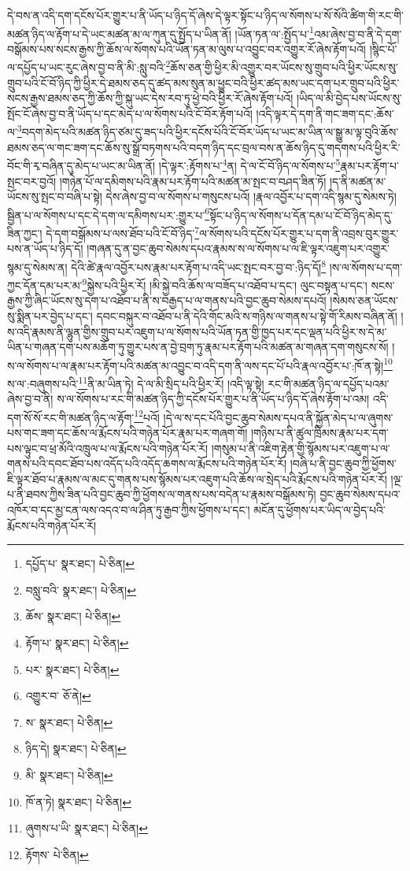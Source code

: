 དེ་བས་ན་འདི་དག་དངོས་པོར་གྱུར་པ་ནི་ཡོད་པ་ཉིད་དོ་ཞེས་དེ་ལྟར་སྟོང་པ་ཉིད་ལ་སོགས་པ་སོ་སོའི་ཚིག་གི་རང་གི་མཚན་ཉིད་ལ་རྟོག་པ་དེ་ཡང་མཚན་མ་ལ་ཀུན་དུ་སྤྱོད་པ་ཡིན་ནོ། །ཡོན་ཏན་ལ་:སྤྱོད་པ་\footnote{དཔྱོད་པ་  སྣར་ཐང་།  པེ་ཅིན། }འམ་ཞེས་བྱ་བ་ནི་དེ་དག་བསྒོམས་པས་སངས་རྒྱས་ཀྱི་ཆོས་ལ་སོགས་པའི་ཡོན་ཏན་མ་ལུས་པ་འབྱུང་བར་འགྱུར་རོ་ཞེས་རྟོག་པའོ། །སྙིང་པོ་ལ་དཔྱོད་པ་ཡང་རུང་ཞེས་བྱ་བ་ནི་མི་:སླུ་བའི་\footnote{བསླུ་བའི་  སྣར་ཐང་།  པེ་ཅིན། }ཆོས་ཅན་གྱི་ཕྱིར་མི་འགྱུར་བར་ཡོངས་སུ་གྲུབ་པའི་ཕྱིར་ཡོངས་སུ་གྲུབ་པའི་ངོ་བོ་ཉིད་ཀྱི་ཕྱིར་དེ་ཐམས་ཅད་དུ་ཚད་མས་སུན་མ་ཕྱུང་བའི་ཕྱིར་ཚད་མས་ཡང་དག་པར་གྲུབ་པའི་ཕྱིར་སངས་རྒྱས་ཐམས་ཅད་ཀྱི་ཆོས་ཀྱི་སྐུ་ཡང་དེས་རབ་ཏུ་ཕྱེ་བའི་ཕྱིར་རོ་ཞེས་རྟོག་པའོ། །ཡིད་ལ་མི་བྱེད་པས་ཡོངས་སུ་སྤོང་ངོ་ཞེས་བྱ་བ་ནི་ཡོད་པ་དང་མེད་པ་ལ་སོགས་པའི་ངོ་བོར་རྟོག་པའོ། །འདི་ལྟར་དེ་དག་ནི་གང་ཟག་དང་:ཆོས་ལ་\footnote{ཆོས་  སྣར་ཐང་།  པེ་ཅིན། }བདག་མེད་པའི་མཚན་ཉིད་ཙམ་དུ་ཟད་པའི་ཕྱིར་དངོས་པོའི་ངོ་བོར་ཡོད་པ་ཡང་མ་ཡིན་ལ་སྒྱུ་མ་ལྟ་བུའི་ཆོས་ཐམས་ཅད་ལ་གང་ཟག་དང་ཆོས་སུ་སྒྲོ་བཏགས་པའི་བདག་ཉིད་དང་བྲལ་བས་ན་ཆོས་ཉིད་དུ་གདགས་པའི་ཕྱིར་རི་བོང་གི་རྭ་བཞིན་དུ་མེད་པ་ཡང་མ་ཡིན་ནོ། །དེ་ལྟར་:རྟོགས་པ་\footnote{རྟོག་པ་  སྣར་ཐང་།  པེ་ཅིན། }ན། དེ་ལ་ངོ་བོ་ཉིད་ལ་སོགས་པ་\footnote{པར་  སྣར་ཐང་།  པེ་ཅིན། }རྣམ་པར་རྟོག་པ་སྤང་བར་བྱའོ། །གཉེན་པོ་ལ་དམིགས་པའི་རྣམ་པར་རྟོག་པའི་མཚན་མ་སྤང་བ་བཤད་ཟིན་ཏོ། །ད་ནི་མཚན་མ་ཡོངས་སུ་སྤང་བ་བཞི་པ་སྟེ། དེས་ཞེས་བྱ་བ་ལ་སོགས་པ་གསུངས་པའོ། །རྣལ་འབྱོར་པ་དག་འདི་སྙམ་དུ་སེམས་ཏེ། སྦྱིན་པ་ལ་སོགས་པ་དང་དེ་དག་ལ་དམིགས་པར་:གྱུར་པ་\footnote{འགྱུར་བ་  ཅོ་ནེ། }སྟོང་པ་ཉིད་ལ་སོགས་པ་དོན་དམ་པ་ངོ་བོ་ཉིད་མེད་དུ་ཟིན་ཀྱང་། དེ་དག་བསྒོམས་པ་ལས་ཐོབ་པའི་ངོ་བོ་ཉིད་\footnote{ས་  སྣར་ཐང་།  པེ་ཅིན། }ལ་སོགས་པའི་དངོས་པོར་གྱུར་པ་དག་ནི་འབྲས་བུར་གྱུར་པས་ན་ཡོད་པ་ཉིད་དོ། །གཞན་དུ་ན་བྱང་ཆུབ་སེམས་དཔའ་རྣམས་ས་ལ་སོགས་པ་ལ་ཇི་ལྟར་འཇུག་པར་འགྱུར་སྙམ་དུ་སེམས་ན། དེའི་ཚེ་རྣལ་འབྱོར་པས་རྣམ་པར་རྟོག་པ་འདི་ཡང་སྤང་བར་བྱ་བ་:ཉིད་དོ།\footnote{ཉིད་དེ།  སྣར་ཐང་།  པེ་ཅིན། } །ས་ལ་སོགས་པ་དག་ཀྱང་དོན་དམ་པར་མ་\footnote{མི་  སྣར་ཐང་།  པེ་ཅིན། }སྐྱེས་པའི་ཕྱིར་རོ། །མི་སྐྱེ་བའི་ཆོས་ལ་བཟོད་པ་འཐོབ་པ་དང་། ལུང་བསྟན་པ་དང་། སངས་རྒྱས་ཀྱི་ཞིང་ཡོངས་སུ་དག་པ་འཐོབ་པ་ནི་ས་བརྒྱད་པ་ལ་གནས་པའི་བྱང་ཆུབ་སེམས་དཔའོ། །སེམས་ཅན་ཡོངས་སུ་སྨིན་པར་བྱེད་པ་དང་། དབང་བསྐུར་བ་འཐོབ་པ་ནི་དེའི་གོང་མའི་ས་གཉིས་ལ་གནས་པ་སྟེ་གོ་རིམས་བཞིན་ནོ། །ས་འདི་རྣམས་ནི་ལྷུན་གྱིས་གྲུབ་པར་འཇུག་པ་ལ་སོགས་པའི་ཡོན་ཏན་གྱི་ཁྱད་པར་དང་ལྡན་པའི་ཕྱིར་ས་དེ་མ་ཡིན་པ་གཞན་དག་པས་མཆོག་ཏུ་གྱུར་པས་ན་བྱེ་བྲག་ཏུ་རྣམ་པར་རྟོག་པའི་མཚན་མ་གཞན་དག་གསུངས་སོ། །ས་ལ་སོགས་པ་ལ་རྣམ་པར་རྟོག་པའི་མཚན་མ་འབྱུང་བ་འདི་དག་ནི་ལས་དང་པོ་པའི་རྣལ་འབྱོར་པ་:ཁོ་ན་སྟེ།\footnote{ཁོ་ན་ཏེ།  སྣར་ཐང་།  པེ་ཅིན། } ས་ལ་:བཞུགས་པའི་\footnote{ཞུགས་པ་ཡི་  སྣར་ཐང་།  པེ་ཅིན། }ནི་མ་ཡིན་ཏེ། དེ་ལ་མི་སྲིད་པའི་ཕྱིར་རོ། །འདི་ལྟ་སྟེ། རང་གི་མཚན་ཉིད་ལ་དཔྱོད་པའམ་ཞེས་བྱ་བ་ནི། ས་ལ་སོགས་པ་རང་གི་མཚན་ཉིད་ཀྱི་དངོས་པོར་གྱུར་པ་ནི་ཡོད་པ་ཉིད་དོ་ཞེས་རྟོག་པ་འམ། འདི་དག་སོ་སོ་རང་གི་མཚན་ཉིད་ལ་རྟོག་\footnote{རྟོགས་  པེ་ཅིན། }པའོ། །དེ་ལ་ས་དང་པོའི་བྱང་ཆུབ་སེམས་དཔའ་ནི་སྐྱོན་མེད་པ་ལ་ཞུགས་པས་གང་ཟག་དང་ཆོས་ལ་རྨོངས་པའི་གཉེན་པོར་རྣམ་པར་གཞག་གོ། །གཉིས་པ་ནི་ཚུལ་ཁྲིམས་རྣམ་པར་དག་པས་ལྟུང་བ་ཕྲ་མོའི་འཁྲུལ་པ་ལ་རྨོངས་པའི་གཉེན་པོར་རོ། །གསུམ་པ་ནི་འཇིག་རྟེན་གྱི་སྙོམས་པར་འཇུག་པ་ལ་གནས་པའི་དབང་ཐོབ་པས་འདོད་པའི་འདོད་ཆགས་ལ་རྨོངས་པའི་གཉེན་པོར་རོ། །བཞི་པ་ནི་བྱང་ཆུབ་ཀྱི་ཕྱོགས་ཇི་ལྟར་ཐོབ་པ་རྣམས་ལ་མང་དུ་གནས་པས་སྙོམས་པར་འཇུག་པའི་ཆོས་ལ་སྲེད་པའི་རྨོངས་པའི་གཉེན་པོར་རོ། །ལྔ་པ་ནི་ཐབས་ཀྱིས་ཟིན་པའི་བྱང་ཆུབ་ཀྱི་ཕྱོགས་ལ་གནས་པས་བདེན་པ་རྣམས་བསྒོམས་ཏེ། བྱང་ཆུབ་སེམས་དཔའ་འཁོར་བ་དང་མྱ་ངན་ལས་འདའ་བ་ལ་ཤིན་ཏུ་རྒྱབ་ཀྱིས་ཕྱོགས་པ་དང་། མངོན་དུ་ཕྱོགས་པར་ཡིད་ལ་བྱེད་པའི་རྨོངས་པའི་གཉེན་པོར་རོ། 